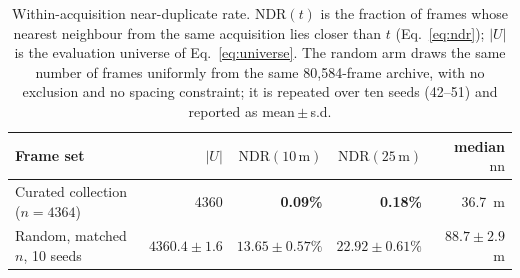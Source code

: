 \begin{table}[t]
\centering
\caption{Within-acquisition near-duplicate rate. $\mathrm{NDR}(t)$ is the
fraction of frames whose nearest neighbour from the same acquisition lies closer
than $t$ (Eq.~\ref{eq:ndr}); $|U|$ is the evaluation universe of
Eq.~\ref{eq:universe}. The random arm draws the same number of frames
uniformly from the same 80{,}584-frame archive, with no exclusion and no
spacing constraint; it is repeated over ten seeds (42--51) and reported as
mean\,$\pm$\,s.d.}
\label{tab:nearduplicate}
\small
\begin{tabular}{lrrrr}
\toprule
Frame set & $|U|$ & $\mathrm{NDR}(10\,\mathrm{m})$ & $\mathrm{NDR}(25\,\mathrm{m})$ & median $\mathrm{nn}$ \\
\midrule
Curated collection ($n{=}4364$) & 4360 & \textbf{0.09\%} & \textbf{0.18\%} & 36.7~m \\
Random, matched $n$, 10 seeds   & $4360.4 \pm 1.6$ & $13.65 \pm 0.57\%$ & $22.92 \pm 0.61\%$ & $88.7 \pm 2.9$~m \\
\bottomrule
\end{tabular}
\end{table}



